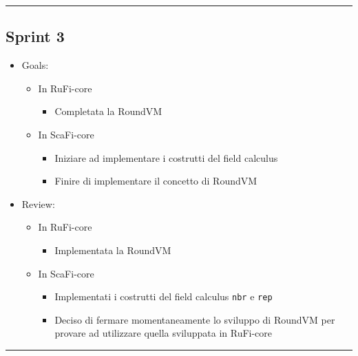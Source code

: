 \documentclass[12pt, a4paper]{article}
\begin{document}
\par\noindent\rule{\textwidth}{0.5pt}

\subsection*{Sprint 3}

\begin{itemize}
    \item Goals:
          \begin{itemize}
              \item In RuFi-core
                    \begin{itemize}
                        \item Completata la RoundVM
                    \end{itemize}
              \item In ScaFi-core
                    \begin{itemize}
                        \item Iniziare ad implementare i costrutti del field calculus
                        \item Finire di implementare il concetto di RoundVM
                    \end{itemize}
          \end{itemize}
    \item Review:
          \begin{itemize}
              \item In RuFi-core
                    \begin{itemize}
                        \item Implementata la RoundVM
                    \end{itemize}
              \item In ScaFi-core
                    \begin{itemize}
                        \item Implementati i costrutti del field calculus \texttt{nbr} e \texttt{rep}
                        \item Deciso di fermare momentaneamente lo sviluppo di RoundVM per provare ad utilizzare quella sviluppata in RuFi-core
                    \end{itemize}
          \end{itemize}
\end{itemize}

\par\noindent\rule{\textwidth}{0.5pt}
\end{document}
